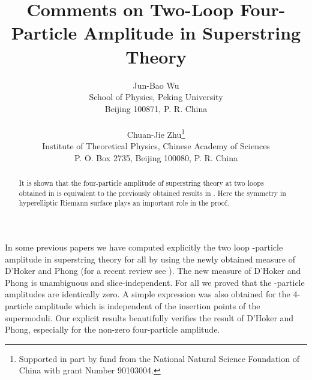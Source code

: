 \documentclass[a4paper,12pt]{article}
\begin{document}
\title{\bf Comments on Two-Loop Four-Particle Amplitude in
Superstring Theory}

\author{Jun-Bao Wu \\School of Physics, Peking University \\
Beijing 100871, P. R. China\\ \\
Chuan-Jie Zhu\thanks{Supported in
part by fund from the National Natural Science Foundation of China
with grant Number
90103004.} \\
Institute of Theoretical Physics,
Chinese Academy of Sciences\\
P. O. Box 2735,  Beijing 100080, P. R. China}

\maketitle


\begin{abstract}
It is shown that the four-particle amplitude of superstring theory
at two loops obtained in \cite{AllZhu1,AllZhu3} is equivalent to
the previously obtained results in \cite{IengoZhu2, IengoZhu3,
Zhu}. Here the \coordHE{} symmetry in hyperelliptic Riemann
surface plays an important role in the proof.
\end{abstract}



In some previous papers \cite{AllZhu1, AllZhu3, AllZhu2} we have
computed explicitly the two loop \coordHE{}-particle amplitude in
superstring theory for all \coordHE{} by using the newly obtained
measure of D'Hoker and Phong \cite{DHokerPhong2, DHokerPhong3,
DHokerPhong4, DHokerPhong5} (for a recent review see
\cite{DHokerPhong1, DHokerPhong6}). The new measure of D'Hoker and
Phong is unambiguous and slice-independent. For all \coordHE{} we
proved that the \coordHE{}-particle amplitudes are identically zero. A
simple expression was also obtained for the 4-particle amplitude
which is independent of the insertion points of the supermoduli.
Our explicit results beautifully verifies the result of D'Hoker
and Phong, especially for the non-zero four-particle amplitude.
\end{document}
